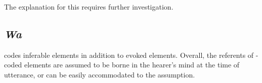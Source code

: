 The explanation for this requires further investigation.

 







\subsection{\textit{Wa}}\label{Wa}

 codes inferable elements in addition to evoked elements.
Overall, the referents of -coded elements are assumed to be
borne in the hearer's mind at the time of utterance,
or can be easily accommodated to the assumption.

